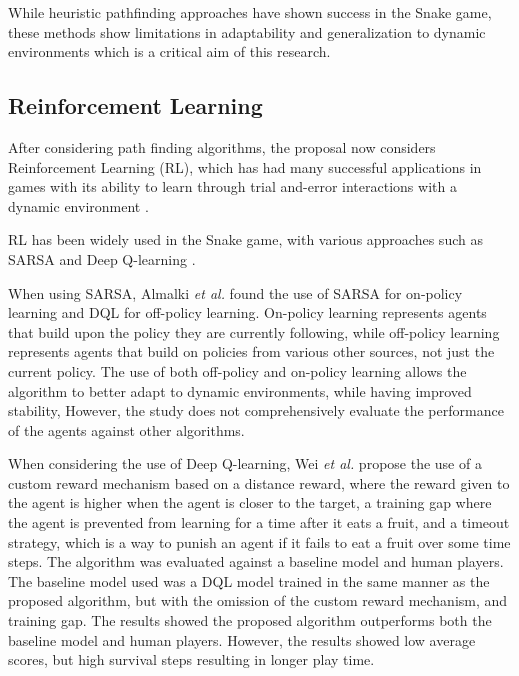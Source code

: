 \documentclass[a4paper,12pt]{article}
\begin{document}
While heuristic pathfinding approaches have shown success in the Snake game, these methods show limitations in adaptability and generalization 
to dynamic environments which is a critical aim of this research.


\subsection{Reinforcement Learning}
After considering path finding algorithms, the proposal now considers Reinforcement Learning (RL), 
which has had many successful applications in games with its ability to learn through trial and-error interactions with a dynamic environment \cite{DRL}.


RL has been widely used in the Snake game, with various approaches such as SARSA \cite{Reinforcement1} 
and Deep Q-learning \cite{Reinforcement2}\cite{Reinforcement7}.


When using SARSA, 
Almalki \textit{et al.} \cite{Reinforcement1} found the use of SARSA for on-policy learning and DQL for off-policy learning.
On-policy learning represents agents that build upon the policy they are currently following,
while off-policy learning represents agents that build on policies from various other sources, not just the current policy.
The use of both off-policy and on-policy learning allows the algorithm to better adapt to dynamic environments, while having improved stability, However, the study does not comprehensively evaluate the performance of the agents against other algorithms.

When considering the use of Deep Q-learning, Wei \textit{et al.} \cite{Reinforcement7} 
propose the use of a custom reward mechanism based on a distance reward, where the reward given 
to the agent is higher when the agent is closer to the target, 
a training gap where the agent is prevented from learning for a time after it eats a fruit,
and a timeout strategy, which is a way to punish an agent if it fails to eat a fruit over some time steps.
The algorithm was evaluated against a baseline model and human players. The baseline model used was a DQL model trained in the same manner as the proposed algorithm, but with the omission of the custom reward mechanism, and training gap. The results showed the proposed algorithm outperforms both the baseline model and human players.
However, the results showed low average scores, but high survival steps resulting in longer play time.
\end{document}
